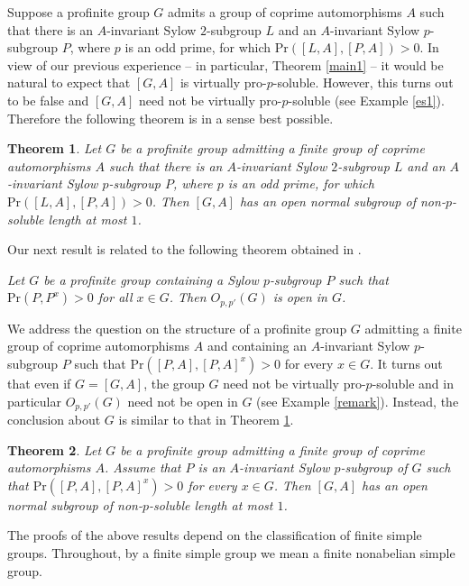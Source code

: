 \documentclass[12pt]{amsart}
\newtheorem{theorem}{\bf Theorem}[section]
\newcommand{\pr }{\mathrm{Pr} }
\begin{document}
Suppose a profinite group $G$ admits a group of coprime automorphisms $A$ such that there is an $A$-invariant Sylow $2$-subgroup $L$ and  an $A$-invariant Sylow $p$-subgroup $P$, where $p$ is an odd prime, for which $\pr([L,A],[P,A])>0$. In view of our previous experience -- in particular, Theorem \ref{main1} -- it would be natural to expect that $[G,A]$ is virtually pro-$p$-soluble. However, this turns out to be false and $[G,A]$ need not be virtually pro-$p$-soluble (see  Example \ref{es1}).  Therefore the following theorem is in a sense best possible.

\begin{theorem}\label{main44}
Let $G$ be a profinite group admitting a finite group of coprime automorphisms $A$ such that there is an $A$-invariant Sylow $2$-subgroup $L$ and an $A$-invariant Sylow $p$-subgroup $P$, where $p$ is an odd prime, for which $\pr([L,A],[P,A])>0$. Then $[G,A]$ has an open normal subgroup of non-$p$-soluble length at most $1$. 
 \end{theorem} 

Our next result is related to the following theorem obtained in \cite{DGMS1}.\medskip

 {\it Let $G$ be a profinite group containing a Sylow $p$-subgroup $P$ such that $\pr(P,P^x)>0$ for all $x\in G$. Then $O_{p,p'}(G)$ is open in $G$.}
\medskip

We address the question on the structure of a profinite group $G$ admitting a finite group of coprime automorphisms $A$ and containing an $A$-invariant Sylow $p$-subgroup $P$ such that $\pr([P,A],[P,A]^x)>0$ for every $x\in G$. It turns out that even if $G=[G,A]$, the group $G$ need not be virtually pro-$p$-soluble and in particular $O_{p,p'}(G)$ need not be open in $G$ (see Example \ref{remark}). Instead, the conclusion about $G$ is similar to that in Theorem \ref{main44}.



\begin{theorem}\label{main5}
 Let $G$ be a profinite group admitting a finite group of coprime automorphisms $A$. Assume that $P$ is an $A$-invariant Sylow $p$-subgroup of $G$ such that $\pr([P,A],[P,A]^x)>0$ for every $x\in G$. 
Then $[G,A]$ has an open normal subgroup of non-$p$-soluble length at most $1$. 
 \end{theorem} 

The proofs of the above results depend on the classification of finite simple groups. Throughout, by a finite simple group we mean a finite nonabelian simple group.
\end{document}
